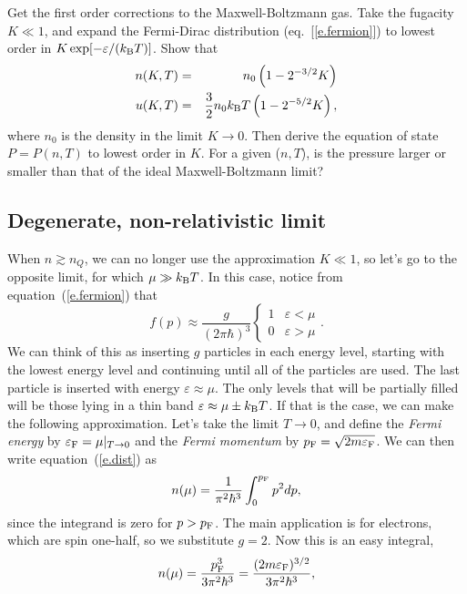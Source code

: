 \begin{exercisebox}
Get the first order corrections to the Maxwell-Boltzmann gas. Take the fugacity $K \ll 1$, and expand the Fermi-Dirac distribution  (eq.~[\ref{e.fermion}]) to lowest order in $K\exp[-\varepsilon/(k_\mathrm{B} T)]$. Show that 
\begin{eqnarray*}
 n(K,T) &=& n_{0}\left(1 - 2^{-3/2}K\right) \\
 u(K,T) &=& \frac{3}{2}n_{0}k_\mathrm{B} T \left(1-2^{-5/2}K\right),
\end{eqnarray*}
where $n_{0}$ is the density in the limit $K\to 0$.
Then derive the equation of state $P = P(n,T)$ to lowest order in $K$. For a given ($n, T$), is the pressure larger or smaller than that of the ideal Maxwell-Boltzmann limit?
\end{exercisebox}

\subsection{Degenerate, non-relativistic limit}\label{s.deg-limit-fermions}
When $n\gtrsim n_{Q}$, we can no longer use the approximation $K \ll 1$, so let's go to the opposite limit, for which $\mu \gg k_\mathrm{B} T$.  In this case, notice from equation~(\ref{e.fermion}) that
\begin{equation}
f(p) \approx \frac{g}{(2\pi\hbar)^{3}}\left\{\begin{array}{lr} 1 & \varepsilon < \mu\\ 0 & \varepsilon> \mu\end{array}\right. .
\end{equation}
We can think of this as inserting $g$ particles in each energy level, starting with the lowest energy level and continuing until all of the particles are used. The last particle is inserted with energy $\varepsilon \approx \mu$.  The only levels that will be partially filled will be those lying in a thin band $\varepsilon \approx\mu \pm k_\mathrm{B} T$.  If that is the case, we can make the following approximation.  Let's take the limit $T \to 0$, and define the \emph{Fermi energy} by $\varepsilon_{\mathrm{F}} = \mu|_{T\to 0}$ and the \emph{Fermi momentum} by $p_{\mathrm{F}} = \sqrt{2m\varepsilon_{\mathrm{F}}}$.  We can then write equation~(\ref{e.dist}) as
\begin{equation}
n(\mu) = \frac{1}{\pi^{2}\hbar^{3}}\int_{0}^{p_{\mathrm{F}}} p^{2} dp,
\end{equation}
since the integrand is zero for $p > p_{\mathrm{F}}$.  The main application is for electrons, which are spin one-half, so we substitute $g = 2$. Now this is an easy integral,
\begin{equation}\label{e.n-deg}
n(\mu) = \frac{p_{\mathrm{F}}^{3}}{3\pi^{2}\hbar^{3}} = \frac{(2m\varepsilon_{\mathrm{F}})^{3/2}}{3\pi^{2}\hbar^{3}},
\end{equation}
